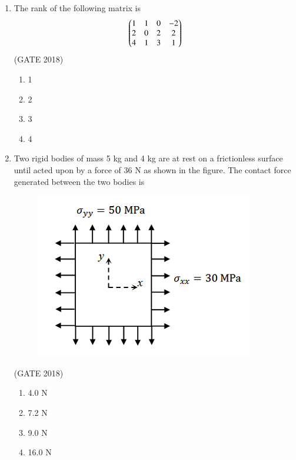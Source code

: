 \documentclass[journal,12pt,onecolumn]{IEEEtran}
\theoremstyle{remark}
\begin{document}
\begin{enumerate}
\item The rank of the following matrix is
\[
\begin{pmatrix}
1 & 1 & 0 & -2 \\
2 & 0 & 2 & 2 \\
4 & 1 & 3 & 1 \\
\end{pmatrix}
\]
\hfill{(GATE 2018)}
\begin{multicols}{4}
\begin{enumerate}
    \item 1
    \item 2
    \item 3
    \item 4
\end{enumerate}
\end{multicols}
\vspace{1cm}
\newpage
\item Two rigid bodies of mass 5 kg and 4 kg are at rest on a frictionless surface until acted upon by a force of 36 N as shown in the figure. The contact force generated between the two bodies is
\begin{figure}[h]
    \centering
    \includegraphics[width=0.5\linewidth]{GATE-CE-2018/29-1.png}
    \caption{}
    \label{29-2}
\end{figure}
\hfill{(GATE 2018)}
\begin{multicols}{4}
\begin{enumerate}
    \item 4.0 N
    \item 7.2 N
    \item 9.0 N
    \item 16.0 N
\end{enumerate}
\end{multicols}
\vspace{1cm}


\end{enumerate}
\end{document}
